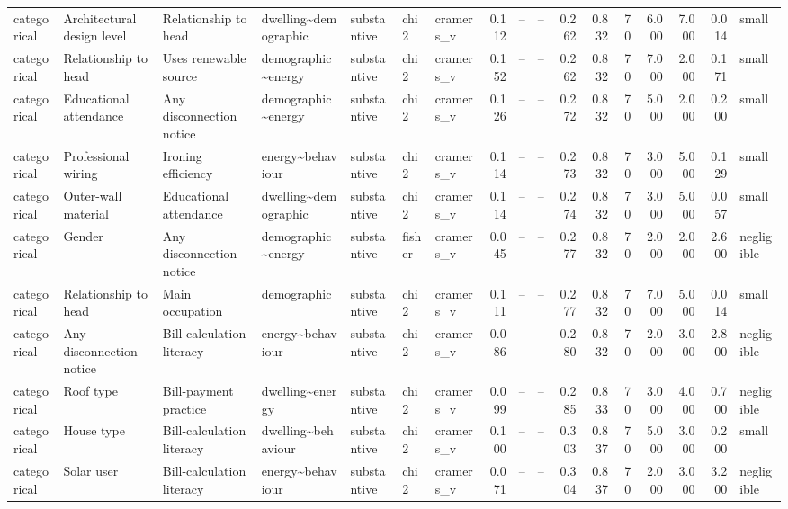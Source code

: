 \begin{table}
\begin{tabular}{lllllllrrrrrrrrrl}
categorical & Architectural design level & Relationship to head & dwelling\textasciitilde demographic & substantive & chi2 & cramers\_v & 0.112 & -- & -- & 0.262 & 0.832 & 70 & 6.000 & 7.000 & 0.014 & small \\
categorical & Relationship to head & Uses renewable source & demographic\textasciitilde energy & substantive & chi2 & cramers\_v & 0.152 & -- & -- & 0.262 & 0.832 & 70 & 7.000 & 2.000 & 0.171 & small \\
categorical & Educational attendance & Any disconnection notice & demographic\textasciitilde energy & substantive & chi2 & cramers\_v & 0.126 & -- & -- & 0.272 & 0.832 & 70 & 5.000 & 2.000 & 0.200 & small \\
categorical & Professional wiring & Ironing efficiency & energy\textasciitilde behaviour & substantive & chi2 & cramers\_v & 0.114 & -- & -- & 0.273 & 0.832 & 70 & 3.000 & 5.000 & 0.129 & small \\
categorical & Outer-wall material & Educational attendance & dwelling\textasciitilde demographic & substantive & chi2 & cramers\_v & 0.114 & -- & -- & 0.274 & 0.832 & 70 & 3.000 & 5.000 & 0.057 & small \\
categorical & Gender & Any disconnection notice & demographic\textasciitilde energy & substantive & fisher & cramers\_v & 0.045 & -- & -- & 0.277 & 0.832 & 70 & 2.000 & 2.000 & 2.600 & negligible \\
categorical & Relationship to head & Main occupation & demographic & substantive & chi2 & cramers\_v & 0.111 & -- & -- & 0.277 & 0.832 & 70 & 7.000 & 5.000 & 0.014 & small \\
categorical & Any disconnection notice & Bill-calculation literacy & energy\textasciitilde behaviour & substantive & chi2 & cramers\_v & 0.086 & -- & -- & 0.280 & 0.832 & 70 & 2.000 & 3.000 & 2.800 & negligible \\
categorical & Roof type & Bill-payment practice & dwelling\textasciitilde energy & substantive & chi2 & cramers\_v & 0.099 & -- & -- & 0.285 & 0.833 & 70 & 3.000 & 4.000 & 0.700 & negligible \\
categorical & House type & Bill-calculation literacy & dwelling\textasciitilde behaviour & substantive & chi2 & cramers\_v & 0.100 & -- & -- & 0.303 & 0.837 & 70 & 5.000 & 3.000 & 0.200 & small \\
categorical & Solar user & Bill-calculation literacy & energy\textasciitilde behaviour & substantive & chi2 & cramers\_v & 0.071 & -- & -- & 0.304 & 0.837 & 70 & 2.000 & 3.000 & 3.200 & negligible \\

\end{tabular}
\end{table}
